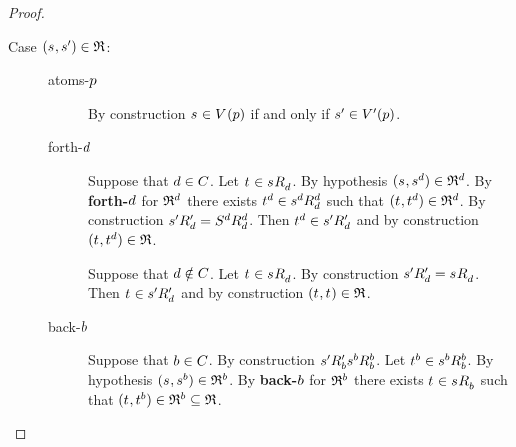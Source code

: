 \begin{proof}
\begin{description}
    \item[Case $(\kStateS, \kStateSP) \in \refinement$:]
        \hfill
        \begin{description}
            \item[atoms-$\atomP$] 
                By construction $\kStateS \in \kValuation(\atomP)$ if and only if $\kStateSP \in \kValuationP(\atomP)$.
            \item[forth-$\agentD$]
                Suppose that $\agentD \in \agentsC$.
                Let $\kStateT \in \kSuccessorsD{\kStateS}$.
                By hypothesis $(\kStateS, \kStateS[\agentD]) \in \refinement^\agentD$.
                By {\bf forth-$\agentD$} for $\refinement^\agentD$ there exists $\kStateT[\agentD] \in \kSuccessorsD[\agentD]{\kStateS[\agentD]}$ such that $(\kStateT, \kStateT[\agentD]) \in \refinement^\agentD$.
                By construction $\kSuccessorsPD{\kStateSP} = \kSuccessorsD[\agentD]{\kStates[\agentD]}$.
                Then $\kStateT[\agentD] \in \kSuccessorsPD{\kStateSP}$ and by construction $(\kStateT, \kStateT[\agentD]) \in \refinement$.

                Suppose that $\agentD \notin \agentsC$.
                Let $\kStateT \in \kSuccessorsD{\kStateS}$.
                By construction $\kSuccessorsPD{\kStateSP} = \kSuccessorsD{\kStateS}$.
                Then $\kStateT \in \kSuccessorsPD{\kStateSP}$ and by construction $(\kStateT, \kStateT) \in \refinement$.
            \item[back-$\agentB$]
                Suppose that $\agentB \in \agentsC$.
                By construction $\kSuccessorsPB{\kStateSP} \kSuccessorsB[\agentB]{\kStateS[\agentB]}$.
                Let $\kStateT[\agentB] \in \kSuccessorsB[\agentB]{\kStateS[\agentB]}$.
                By hypothesis $(\kStateS, \kStateS[\agentB]) \in \refinement^\agentB$.
                By {\bf back-$\agentB$} for $\refinement^\agentB$ there exists $\kStateT \in \kSuccessorsB{\kStateS}$ such that $(\kStateT, \kStateT[\agentB]) \in \refinement^\agentB \subseteq \refinement$.


\end{description}
\end{description}
\end{proof}
